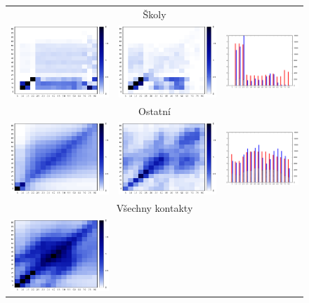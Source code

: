 \begin{figure}
\begin{center}
\begin{tabular}{|ccc|}
      \hline
      \multicolumn{3}{|c|}{Školy} \\      
      \includegraphics[width=38mm]{pic/school_mat.eps} &
      \includegraphics[width=38mm]{pic/school_mat_ref.eps} &
      \includegraphics[width=28mm]{pic/school.eps}\\
      \hline
      \multicolumn{3}{|c|}{Ostatní} \\      
      \includegraphics[width=38mm]{pic/other_mat.eps} &
      \includegraphics[width=38mm]{pic/other_mat_ref.eps} &
      \includegraphics[width=28mm]{pic/other.eps}\\
      \hline
      \multicolumn{3}{|c|}{Všechny kontakty} \\        
      \includegraphics[width=38mm]{pic/all_mat.eps} &

\end{tabular}
\end{center}
\end{figure}
